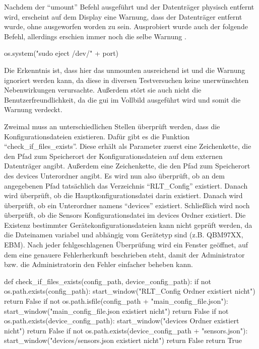 Nachdem der \enquote{umount} Befehl ausgeführt und der Datenträger physisch entfernt wird, erscheint auf dem Display eine Warnung, dass der Datenträger entfernt wurde, ohne ausgeworfen worden zu sein. Ausprobiert wurde auch der folgende Befehl, allerdings erschien immer noch die selbe Warnung \cite{Totor:2022}.
\begin{pythoncode}
	os.system("sudo eject /dev/" + port)
\end{pythoncode}
Die Erkenntnis ist, dass hier das unmounten ausreichend ist und die Warnung ignoriert werden kann, da diese in diversen Testversuchen keine unerwünschten Nebenwirkungen verursachte. Außerdem stört sie auch nicht die Benutzerfreundlichkeit, da die \acs{gui} im Vollbild ausgeführt wird und somit die Warnung verdeckt.

Zweimal muss an unterschiedlichen Stellen überprüft werden, dass die Konfigurationsdateien existieren. Dafür gibt es die Funktion \enquote{check\_if\_files\_exists}. Diese erhält als Parameter zuerst eine Zeichenkette, die den Pfad zum Speicherort der Konfigurationsdateien auf dem externen Datenträger angibt. Außerdem eine Zeichenkette, die den Pfad zum Speicherort des devices Unterordner angibt. Es wird nun also überprüft, ob an dem angegebenen Pfad tatsächlich das Verzeichnis \enquote{RLT\_Config} existiert. Danach wird überprüft, ob die Hauptkonfigurationsdatei darin existiert. Danach wird überprüft, ob ein Unterordner namens \enquote{devices} existiert. Schließlich wird noch überprüft, ob die Sensors Konfigurationsdatei im devices Ordner existiert. Die Existenz bestimmter Gerätekonfigurationsdateien kann nicht geprüft werden, da die Dateinamen variabel und abhängig vom Gerätetyp sind (z.B. QBM97XX, EBM). Nach jeder fehlgeschlagenen Überprüfung wird ein Fenster geöffnet, auf dem eine genauere Fehlerherkunft beschrieben steht, damit der Administrator bzw. die Administratorin den Fehler einfacher beheben kann.
\begin{pythoncode}
def check_if_files_exists(config_path, device_config_path):
	if not os.path.exists(config_path):
		start_window("RLT_Config Ordner existiert nicht")
		return False
	if not os.path.isfile(config_path + "main_config_file.json"):
		start_window("main_config_file.json existiert nicht")
		return False
	if not os.path.exists(device_config_path):
		start_window("devices Ordner existiert nicht")
		return False
	if not os.path.exists(device_config_path + "sensors.json"):
		start_window("devices/sensors.json existiert nicht")
		return False
	return True
\end{pythoncode}